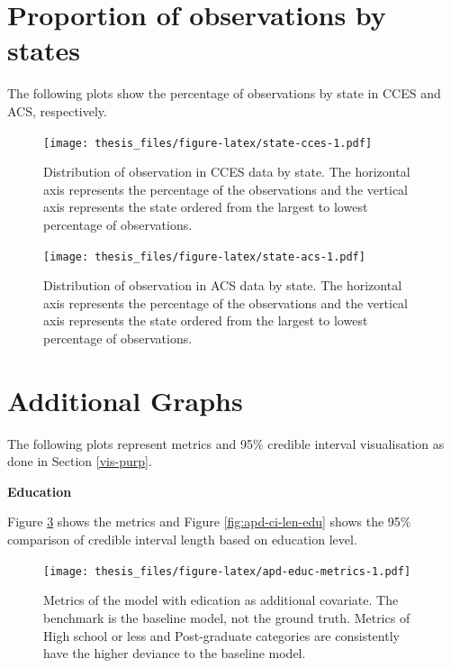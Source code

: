 \documentclass{monashthesis}
\begin{document}
\hypertarget{apd-state}{%
\section{Proportion of observations by states}\label{apd-state}}

The following plots show the percentage of observations by state in CCES and ACS, respectively.

\begin{figure}
\centering
\texttt{[image: thesis\_files/figure-latex/state-cces-1.pdf]}
\caption{\label{fig:state-cces}Distribution of observation in CCES data by state. The horizontal axis represents the percentage of the observations and the vertical axis represents the state ordered from the largest to lowest percentage of observations.}
\end{figure}

\begin{figure}
\centering
\texttt{[image: thesis\_files/figure-latex/state-acs-1.pdf]}
\caption{\label{fig:state-acs}Distribution of observation in ACS data by state. The horizontal axis represents the percentage of the observations and the vertical axis represents the state ordered from the largest to lowest percentage of observations.}
\end{figure}

\hypertarget{additional-graphs}{%
\section{Additional Graphs}\label{additional-graphs}}

The following plots represent metrics and 95\% credible interval visualisation as done in Section \ref{vis-purp}.

\textbf{Education}

Figure \ref{fig:apd-educ-metrics} shows the metrics and Figure \ref{fig:apd-ci-len-edu} shows the 95\% comparison of credible interval length based on education level.

\begin{figure}
\centering
\texttt{[image: thesis\_files/figure-latex/apd-educ-metrics-1.pdf]}
\caption{\label{fig:apd-educ-metrics}Metrics of the model with edication as additional covariate. The benchmark is the baseline model, not the ground truth. Metrics of High school or less and Post-graduate categories are consistently have the higher deviance to the baseline model.}
\end{figure}
\end{document}
